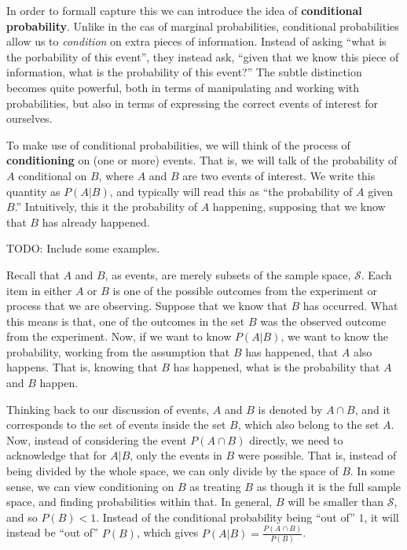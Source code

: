 \documentclass[
  letterpaper,
  DIV=11,
  numbers=noendperiod]{scrreprt}
\begin{document}
In order to formall capture this we can introduce the idea of
\textbf{conditional probability}. Unlike in the cas of marginal
probabilities, conditional probabilities allow us to \emph{condition} on
extra pieces of information. Instead of asking ``what is the porbability
of this event'', they instead ask, ``given that we know this piece of
information, what is the probability of this event?'' The subtle
distinction becomes quite powerful, both in terms of manipulating and
working with probabilities, but also in terms of expressing the correct
events of interest for ourselves.

To make use of conditional probabilities, we will think of the process
of \textbf{conditioning} on (one or more) events. That is, we will talk
of the probability of \(A\) conditional on \(B\), where \(A\) and \(B\)
are two events of interest. We write this quantity as \(P(A|B)\), and
typically will read this as ``the probability of \(A\) given \(B\).''
Intuitively, this it the probability of \(A\) happening, supposing that
we know that \(B\) has already happened.

TODO: Include some examples.

Recall that \(A\) and \(B\), as events, are merely subsets of the sample
space, \(\mathcal{S}\). Each item in either \(A\) or \(B\) is one of the
possible outcomes from the experiment or process that we are observing.
Suppose that we know that \(B\) has occurred. What this means is that,
one of the outcomes in the set \(B\) was the observed outcome from the
experiment. Now, if we want to know \(P(A|B)\), we want to know the
probability, working from the assumption that \(B\) has happened, that
\(A\) also happens. That is, knowing that \(B\) has happened, what is
the probability that \(A\) and \(B\) happen.

Thinking back to our discussion of events, \(A\) and \(B\) is denoted by
\(A \cap B\), and it corresponds to the set of events inside the set
\(B\), which also belong to the set \(A\). Now, instead of considering
the event \(P(A\cap B)\) directly, we need to acknowledge that for
\(A|B\), only the events in \(B\) were possible. That is, instead of
being divided by the whole space, we can only divide by the space of
\(B\). In some sense, we can view conditioning on \(B\) as treating
\(B\) as though it is the full sample space, and finding probabilities
within that. In general, \(B\) will be smaller than \(\mathcal{S}\), and
so \(P(B) < 1\). Instead of the conditional probability being ``out of''
\(1\), it will instead be ``out of'' \(P(B)\), which gives
\(P(A|B) = \frac{P(A\cap B)}{P(B)}\).
\end{document}
